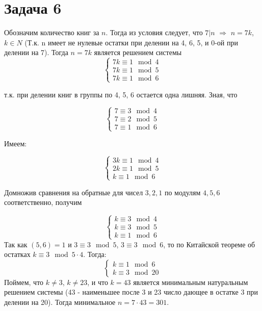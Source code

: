 \documentclass{article}
\begin{document}
		  \section {Задача 6}	
		  Обозначим количество книг за $n$. Тогда из условия следует, что $7 | n$ $\Rightarrow$ $n = 7k$, $k \in N$ (Т.к. n имеет не нулевые остатки при делении на 4, 6, 5, и 0-ой при делении на 7). Тогда $n = 7k$ является решением системы 
		  \begin{equation*} 
			  \begin{cases}
			  7k \equiv 1 \mod 4 \\
			  7k \equiv 1 \mod 5 \\
			  7k \equiv 1 \mod 6
			  \end{cases}
		  \end{equation*}
		  
		  т.к. при делении книг в группы по 4, 5, 6 остается одна лишняя. Зная, что
		  
		  \begin{equation*} 
		  \begin{cases}
		  7 \equiv 3 \mod 4 \\
		  7 \equiv 2 \mod 5 \\
		  7 \equiv 1 \mod 6
		  \end{cases}
		  \end{equation*}
		  
		  Имеем:
		  
		  \begin{equation*} 
		  \begin{cases}
		  3k \equiv 1 \mod 4 \\
		  2k \equiv 1 \mod 5 \\
		  k  \equiv 1 \mod 6
		  \end{cases}
		  \end{equation*}
		  
		  Домножив сравнения на обратные для чисел $3, 2, 1$ по модулям $4, 5, 6$ соответственно, получим
		  
		  \begin{equation*} 
		  \begin{cases}
		  k \equiv 3 \mod 4 \\
		  k \equiv 3 \mod 5 \\
		  k \equiv 1 \mod 6
		  \end{cases}
		  \end{equation*}
		  Так как $(5, 6) = 1$ и  $3 \equiv 3 \mod 5$, $3\equiv 3 \mod 6$, то по Китайской теореме об остатках $k \equiv 3 \mod 5\cdot 4$. Тогда:
		  \begin{equation*} 
		  \begin{cases}
		  k \equiv 1 \mod 6 \\
		  k \equiv 3 \mod 20
		  \end{cases}
		  \end{equation*}
		  Поймем, что $k \ne 3$, $k \ne 23$, и что $k=43$ является минимальным натуральным решением системы (43 - наименьшее после 3 и 23 число дающее в остатке 3 при делении на 20). Тогда минимальное $n = 7 \cdot 43 = 301$.
		  
\end{document}
